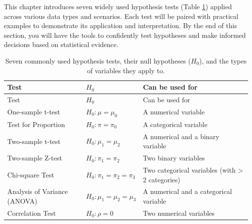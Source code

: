 \documentclass[
]{book}
\theoremstyle{definition}
\theoremstyle{definition}
\theoremstyle{definition}
\theoremstyle{definition}
\theoremstyle{remark}
\begin{document}
This chapter introduces seven widely used hypothesis tests (Table \ref{tab:hypothesis-test}) applied across various data types and scenarios. Each test will be paired with practical examples to demonstrate its application and interpretation. By the end of this section, you will have the tools to confidently test hypotheses and make informed decisions based on statistical evidence.

\begin{longtable}[]{@{}
  >{\raggedright\arraybackslash}p{}
  >{\raggedright\arraybackslash}p{}
  >{\raggedright\arraybackslash}p{}@{}}
\caption{\label{tab:hypothesis-test} Seven commonly used hypothesis tests, their null hypotheses (\(H_0\)), and the types of variables they apply to.}\tabularnewline
\toprule\noalign{}
\begin{minipage}[b]{\linewidth}\raggedright
Test
\end{minipage} & \begin{minipage}[b]{\linewidth}\raggedright
\(H_0\)
\end{minipage} & \begin{minipage}[b]{\linewidth}\raggedright
Can be used for
\end{minipage} \\
\midrule\noalign{}
\endfirsthead
\toprule\noalign{}
\begin{minipage}[b]{\linewidth}\raggedright
Test
\end{minipage} & \begin{minipage}[b]{\linewidth}\raggedright
\(H_0\)
\end{minipage} & \begin{minipage}[b]{\linewidth}\raggedright
Can be used for
\end{minipage} \\
\midrule\noalign{}
\endhead
\bottomrule\noalign{}
\endlastfoot
One-sample t-test & \(H_0: \mu = \mu_0\) & A numerical variable \\
Test for Proportion & \(H_0: \pi = \pi_0\) & A categorical variable \\
Two-sample t-test & \(H_0: \mu_1 = \mu_2\) & A numerical and a binary variable \\
Two-sample Z-test & \(H_0: \pi_1 = \pi_2\) & Two binary variables \\
Chi-square Test & \(H_0: \pi_1 = \pi_2 = \pi_3\) & Two categorical variables (with \textgreater{} 2 categories) \\
Analysis of Variance (ANOVA) & \(H_0: \mu_1 = \mu_2 = \mu_3\) & A numerical and a categorical variable \\
Correlation Test & \(H_0: \rho = 0\) & Two numerical variables \\
\end{longtable}
\end{document}
